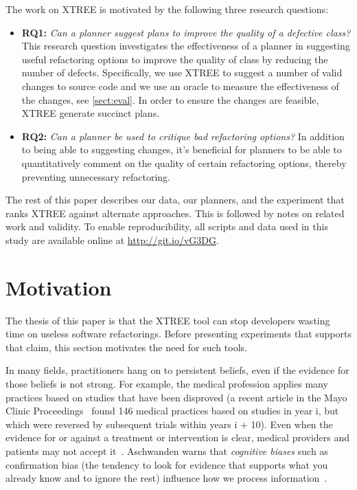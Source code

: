 \documentclass{sig-alternate}
\newcommand{\bi}{\begin{itemize}}
\newcommand{\ei}{\end{itemize}}
\newcommand{\tion}[1]{\textsection\ref{sect:#1}}
\begin{document}
The work on XTREE is motivated by the following three research questions:

\bi
\item \textbf{RQ1:} \textit{Can a planner suggest plans to improve the quality of a defective class?} This research question investigates the effectiveness of a planner in suggesting useful refactoring options to improve the quality of class by reducing the number of defects. Specifically, we use XTREE to suggest a number of valid changes to source code and we use an oracle to measure the effectiveness of the changes, see \tion{eval}. In order to ensure the changes are feasible, XTREE generate succinct plans.

\item \textbf{RQ2:} \textit{Can a planner be used to critique bad refactoring options?} In addition to being able to suggesting changes, it's beneficial for planners to be able to quantitatively comment on the quality of certain refactoring options, thereby preventing unnecessary refactoring.

\ei

The rest of this paper  describes our data, our planners, and the experiment that ranks XTREE against alternate approaches.  This is followed by notes on related work and validity. To enable reproducibility, all scripts and data used in this study are available online at \url{http://git.io/vG3DG}.

\section{Motivation}\label{sect:prelim}



The thesis of this paper is that the XTREE tool can stop developers
wasting time on useless software refactorings. Before presenting experiments
that supports that claim, this section motivates the need for 
such tools.


In many fields,  practitioners hang on to persistent beliefs, even
if the evidence for those beliefs is not strong. For example, the medical profession applies many practices based on studies that have been disproved (a recent article in the Mayo Clinic Proceedings~\cite{prasad13} found 146 medical practices based on studies in year i, but which were reversed by subsequent trials within years i + 10). Even when the evidence for or against a treatment or intervention is clear, medical providers and patients may not accept it~\cite{aschwanden10}. Aschwanden warns that {\em cognitive biases} such as confirmation bias (the tendency to look for evidence that supports what you already know and to ignore the rest) influence how we process information~\cite{aschwanden15}.
\end{document}
